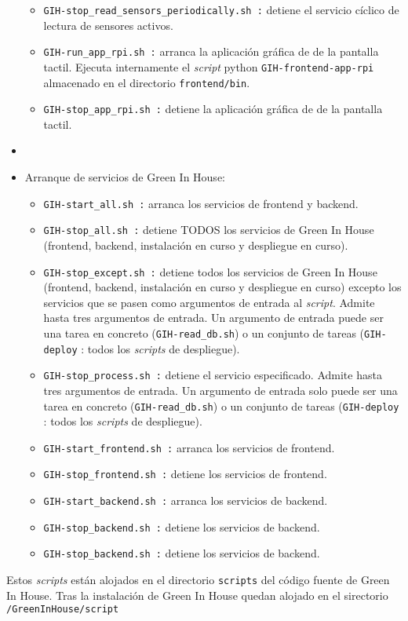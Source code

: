 \begin{itemize}
\begin{itemize}
                \item \texttt{GIH-stop\_read\_sensors\_periodically.sh :} detiene el servicio cíclico de lectura de sensores activos.
                \item \texttt{GIH-run\_app\_rpi.sh :} arranca la aplicación gráfica de de la pantalla tactil. Ejecuta internamente el \textit{script} python \texttt{GIH-frontend-app-rpi} almacenado en el directorio \texttt{frontend/bin}.
                \item \texttt{GIH-stop\_app\_rpi.sh :} detiene la aplicación gráfica de de la pantalla tactil.
            \end{itemize}
            \item   
            \item Arranque de servicios de Green In House:
            \begin{itemize}
                \item \texttt{GIH-start\_all.sh :} arranca los servicios de frontend y backend.
                \item \texttt{GIH-stop\_all.sh :} detiene TODOS los servicios de Green In House (frontend, backend, instalación en curso y despliegue en curso).
                \item \texttt{GIH-stop\_except.sh :} detiene todos los servicios de Green In House (frontend, backend, instalación en curso y despliegue en curso) excepto los servicios que se pasen como argumentos de entrada al \textit{script}. Admite hasta tres argumentos de entrada. Un argumento de entrada puede ser una tarea en concreto (\texttt{GIH-read\_db.sh}) o un conjunto de tareas (\texttt{GIH-deploy} : todos los \textit{scripts} de despliegue).
                \item \texttt{GIH-stop\_process.sh :} detiene el servicio especificado. Admite hasta tres argumentos de entrada. Un argumento de entrada solo puede ser una tarea en concreto (\texttt{GIH-read\_db.sh}) o un conjunto de tareas (\texttt{GIH-deploy} : todos los \textit{scripts} de despliegue).
                \item \texttt{GIH-start\_frontend.sh :} arranca los servicios de frontend.
                \item \texttt{GIH-stop\_frontend.sh :} detiene los servicios de frontend.
                \item \texttt{GIH-start\_backend.sh :} arranca los servicios de backend.
                \item \texttt{GIH-stop\_backend.sh :} detiene los servicios de backend.
                \item \texttt{GIH-stop\_backend.sh :} detiene los servicios de backend.
            \end{itemize}    
            
        \end{itemize} 
        Estos \textit{scripts} están alojados en el directorio \texttt{scripts} del código fuente de Green In House. Tras la instalación de Green In House quedan alojado en el sirectorio \texttt{/GreenInHouse/script}
    
